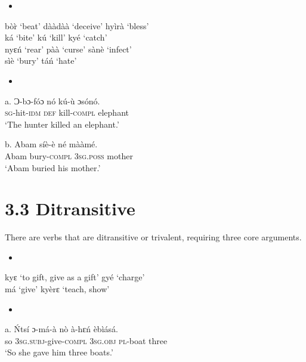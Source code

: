 \documentclass[output=paper]{langsci/langscibook}
\begin{document}
\begin{itemize}
\item \end{itemize}
\gll b\`{o}\`{r}   \textup{‘beat’}    d\`{a}\`{a}d\`{a}\`{a}   \textup{‘deceive’}  hy\`{i}r\`{a}   \textup{‘bless’}    \\
\gll k\'{a}     \textup{‘bite’}    k\'{u}     \textup{‘kill’}    ky\'{e}   \textup{‘catch’}\\
\gll nyɛ\'{n}   \textup{‘rear’}    p\`{a}\`{a}     \textup{‘curse’}    s\`{a}n\`{e}   \textup{‘infect’}    \\
\gll s\`{i}\`{e}     \textup{‘bury’}    t\'{a}\'{n}     \textup{‘hate’}\\
\begin{itemize}
\item \end{itemize}
\gll a.  Ɔ{}-bɔ-f\'{o}ɔ  n\'{o}  k\'{u}-\`{u}     ɔs\'{o}n\'{o}.\\
       \textsc{sg}{}-hit-\textsc{idm}  \textsc{def}  kill-\textsc{compl}  elephant\\
\glt   ‘The hunter killed an elephant.’  
\z

\gll  b.  Abam  s\'{i}\`{e}-\`{e}     n\'{e}    m\`{a}\`{a}m\'{e}.\\
       Abam  bury-\textsc{compl}  \textsc{3sg.poss}  mother\\
\glt   ‘Abam buried his mother.’
\z

\section{3.3  Ditransitive}

There are verbs that are ditransitive or trivalent, requiring three core arguments.

\begin{itemize}
\item \end{itemize}
\gll kyɛ   \textup{‘to gift, give as a gift’  }  gy\'{e}   \textup{‘charge’}\\
\gll m\'{a}     \textup{‘give’}        ky\`{e}rɛ   \textup{‘teach, show’}\\
\begin{itemize}
\item \end{itemize}
\gll a.  \'{N}ts\'{i}  ɔ{}-m\'{a}-\`{a}      n\`{o}    \`{a}-hɛ\'{n}    \`{e}b\`{i}\'{a}s\'{a}.  \\
       so  \textsc{3sg.subj}{}-give-\textsc{compl}  \textsc{3sg.obj}  \textsc{pl}{}-boat    three\\
\glt ‘So she gave him three boats.’ \citep[8]{Martin1936}
\z
\end{document}
